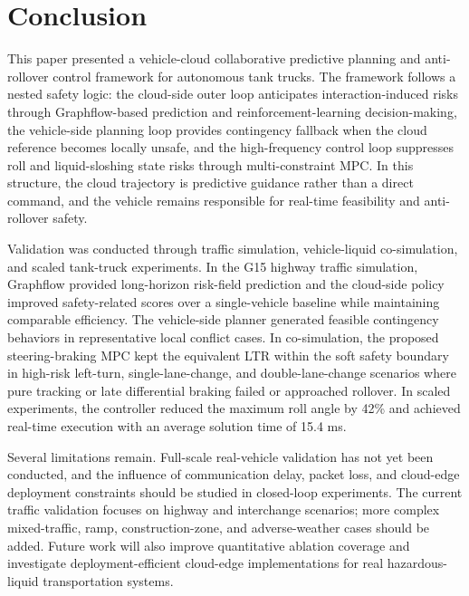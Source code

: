 \section{Conclusion}

This paper presented a vehicle-cloud collaborative predictive planning and anti-rollover control framework for autonomous tank trucks. The framework follows a nested safety logic: the cloud-side outer loop anticipates interaction-induced risks through Graphflow-based prediction and reinforcement-learning decision-making, the vehicle-side planning loop provides contingency fallback when the cloud reference becomes locally unsafe, and the high-frequency control loop suppresses roll and liquid-sloshing state risks through multi-constraint MPC. In this structure, the cloud trajectory is predictive guidance rather than a direct command, and the vehicle remains responsible for real-time feasibility and anti-rollover safety.

Validation was conducted through traffic simulation, vehicle-liquid co-simulation, and scaled tank-truck experiments. In the G15 highway traffic simulation, Graphflow provided long-horizon risk-field prediction and the cloud-side policy improved safety-related scores over a single-vehicle baseline while maintaining comparable efficiency. The vehicle-side planner generated feasible contingency behaviors in representative local conflict cases. In co-simulation, the proposed steering-braking MPC kept the equivalent LTR within the soft safety boundary in high-risk left-turn, single-lane-change, and double-lane-change scenarios where pure tracking or late differential braking failed or approached rollover. In scaled experiments, the controller reduced the maximum roll angle by 42\% and achieved real-time execution with an average solution time of 15.4 ms.

Several limitations remain. Full-scale real-vehicle validation has not yet been conducted, and the influence of communication delay, packet loss, and cloud-edge deployment constraints should be studied in closed-loop experiments. The current traffic validation focuses on highway and interchange scenarios; more complex mixed-traffic, ramp, construction-zone, and adverse-weather cases should be added. Future work will also improve quantitative ablation coverage and investigate deployment-efficient cloud-edge implementations for real hazardous-liquid transportation systems.
